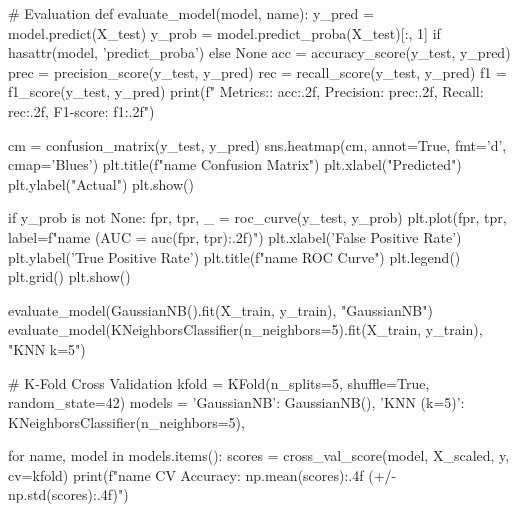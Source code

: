 # Evaluation
def evaluate_model(model, name):
    y_pred = model.predict(X_test)
    y_prob = model.predict_proba(X_test)[:, 1] if hasattr(model, 'predict_proba') else None
    acc = accuracy_score(y_test, y_pred)
    prec = precision_score(y_test, y_pred)
    rec = recall_score(y_test, y_pred)
    f1 = f1_score(y_test, y_pred)
    print(f" Metrics:\nAccuracy: {acc:.2f}, Precision: {prec:.2f}, Recall: {rec:.2f}, F1-score: {f1:.2f}")

    cm = confusion_matrix(y_test, y_pred)
    sns.heatmap(cm, annot=True, fmt='d', cmap='Blues')
    plt.title(f"{name} Confusion Matrix")
    plt.xlabel("Predicted")
    plt.ylabel("Actual")
    plt.show()

    if y_prob is not None:
        fpr, tpr, _ = roc_curve(y_test, y_prob)
        plt.plot(fpr, tpr, label=f"{name} (AUC = {auc(fpr, tpr):.2f})")
        plt.xlabel('False Positive Rate')
        plt.ylabel('True Positive Rate')
        plt.title(f"{name} ROC Curve")
        plt.legend()
        plt.grid()
        plt.show()

evaluate_model(GaussianNB().fit(X_train, y_train), "GaussianNB")
evaluate_model(KNeighborsClassifier(n_neighbors=5).fit(X_train, y_train), "KNN k=5")

# K-Fold Cross Validation
kfold = KFold(n_splits=5, shuffle=True, random_state=42)
models = {
    'GaussianNB': GaussianNB(),
    'KNN (k=5)': KNeighborsClassifier(n_neighbors=5),
}

for name, model in models.items():
    scores = cross_val_score(model, X_scaled, y, cv=kfold)
    print(f"{name} CV Accuracy: {np.mean(scores):.4f} (+/- {np.std(scores):.4f})")
